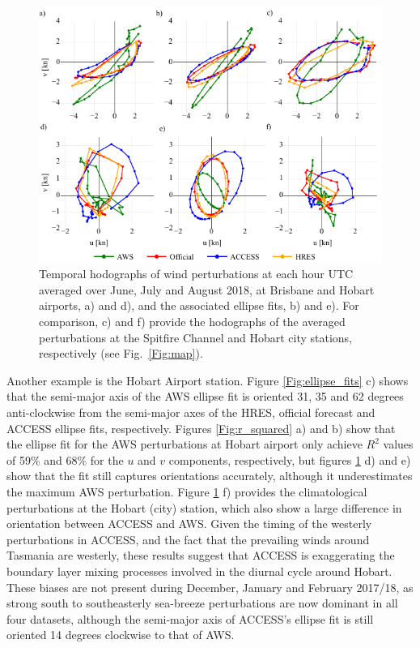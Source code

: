 \documentclass[twocol]{ametsoc}
\begin{document}
\begin{figure}
\centering
\includegraphics[width=39pc]{ellipse_hodo.pdf}
\caption{Temporal hodographs of wind perturbations at each hour UTC averaged over June, July and August 2018, at Brisbane and Hobart airports, a) and d), and the associated ellipse fits, b) and e). For comparison, c) and f) provide the hodographs of the averaged perturbations at the Spitfire Channel and Hobart city stations, respectively (see Fig.~\ref{Fig:map}).}
\label{Fig:ellipse_hodo}
\end{figure}

Another example is the Hobart Airport station. Figure \ref{Fig:ellipse_fits} c) shows that the semi-major axis of the AWS ellipse fit is oriented 31, 35 and 62 degrees anti-clockwise from the semi-major axes of the HRES, official forecast and ACCESS ellipse fits, respectively. Figures \ref{Fig:r_squared} a) and b) show that the ellipse fit for the AWS perturbations at Hobart airport only achieve $R^2$ values of 59\% and 68\% for the $u$ and $v$ components, respectively, but figures \ref{Fig:ellipse_hodo} d) and e) show that the fit still captures orientations accurately, although it underestimates the maximum AWS perturbation. Figure \ref{Fig:ellipse_hodo} f) provides the climatological perturbations at the Hobart (city) station, which also show a large difference in orientation between ACCESS and AWS. Given the timing of the westerly perturbations in ACCESS, and the fact that the prevailing winds around Tasmania are westerly, these results suggest that ACCESS is exaggerating the boundary layer mixing processes involved in the diurnal cycle around Hobart. These biases are not present during December, January and February 2017/18, as strong south to southeasterly sea-breeze perturbations are now dominant in all four datasets, although the semi-major axis of ACCESS's ellipse fit is still oriented 14 degrees clockwise to that of AWS. 
\end{document}
